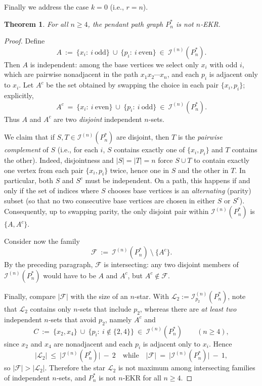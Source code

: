 \documentclass{article}
\newtheorem{theorem}{Theorem}
\theoremstyle{definition}
\newcommand{\1}{\mathbf{1}}
\begin{document}
\medskip

Finally we address the case $k=0$ (i.e., $r=n$). 

\begin{theorem}\label{notEKR3}
For all $n\ge 4$, the pendant path graph $P_n^*$ is \emph{not} $n$‑EKR.
\end{theorem}

\begin{proof}
Define
\[
A\ :=\ \{x_i:\ i\ \text{odd}\}\ \cup\ \{p_i:\ i\ \text{even}\}\ \in\ \mathcal{I}^{(n)}(P_n^*).
\]
Then $A$ is independent: among the base vertices we select only $x_i$ with odd $i$, which are pairwise nonadjacent in the path $x_1x_2\cdots x_n$, and each $p_i$ is adjacent only to $x_i$. Let $A^{c}$ be the set obtained by swapping the choice in each pair $\{x_i,p_i\}$; explicitly,
\[
A^{c}\ =\ \{x_i:\ i\ \text{even}\}\ \cup\ \{p_i:\ i\ \text{odd}\}\ \in\ \mathcal{I}^{(n)}(P_n^*).
\]
Thus $A$ and $A^{c}$ are two \emph{disjoint} independent $n$-sets.

We claim that if $S,T\in \mathcal{I}^{(n)}(P_n^*)$ are disjoint, then $T$ is the \emph{pairwise complement} of $S$ (i.e., for each $i$, $S$ contains exactly one of $\{x_i,p_i\}$ and $T$ contains the other). Indeed, disjointness and $|S|=|T|=n$ force $S\cup T$ to contain exactly one vertex from each pair $\{x_i,p_i\}$ twice, hence one in $S$ and the other in $T$. In particular, both $S$ and $S^{c}$ must be independent. On a path, this happens if and only if the set of indices where $S$ chooses base vertices is an \emph{alternating} (parity) subset (so that no two consecutive base vertices are chosen in either $S$ or $S^{c}$). Consequently, up to swapping parity, the only disjoint pair within $\mathcal{I}^{(n)}(P_n^*)$ is $\{A, A^{c}\}$.

Consider now the family
\[
\mathcal{F}\ :=\ \mathcal{I}^{(n)}(P_n^*)\ \setminus\ \{A^{c}\}.
\]
By the preceding paragraph, $\mathcal{F}$ is intersecting: any two disjoint members of $\mathcal{I}^{(n)}(P_n^*)$ would have to be $A$ and $A^{c}$, but $A^{c}\notin \mathcal{F}$.

Finally, compare $|\mathcal{F}|$ with the size of an $n$‑star. With $\mathcal{L}_2:=\mathcal{I}^{(n)}_{p_2}(P_n^*)$, note that $\mathcal{L}_2$ contains only $n$‑sets that include $p_2$, whereas there are \emph{at least two} independent $n$‑sets that avoid $p_2$, namely $A^{c}$ and
\[
C\ :=\ \{x_2,x_4\}\ \cup\ \{p_i:\ i\notin\{2,4\}\}\ \in\ \mathcal{I}^{(n)}(P_n^*)\qquad(n\ge 4),
\]
since $x_2$ and $x_4$ are nonadjacent and each $p_i$ is adjacent only to $x_i$. Hence
\[
|\mathcal{L}_2|\ \le\ \bigl|\mathcal{I}^{(n)}(P_n^*)\bigr|\ -\ 2
\quad\text{while}\quad
|\mathcal{F}|\ =\ \bigl|\mathcal{I}^{(n)}(P_n^*)\bigr|\ -\ 1,
\]
so $|\mathcal{F}|>|\mathcal{L}_2|$. Therefore the star $\mathcal{L}_2$ is not maximum among intersecting families of independent $n$‑sets, and $P_n^*$ is not $n$‑EKR for all $n\ge 4$.
\end{proof}
\end{document}
